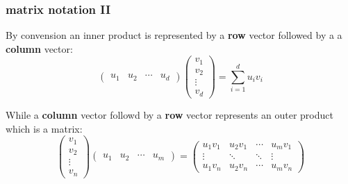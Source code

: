 \documentclass[smaller]{beamer}
\def\darkred{\color{red!70!black}}
\def\vone{{\vskip.1in}}
\begin{document}
\begin{frame}
\frametitle{matrix notation II}

\pause \vone
By convension an {\darkred inner} product is represented by a {\bf row} vector
followed by a a {\bf column} vector:
$$
\begin{pmatrix} u_1 & u_2 &\cdots& u_d \end{pmatrix} \begin{pmatrix} v_1
  \\ v_2 \\ \vdots \\
  v_d \end{pmatrix} = \sum_{i=1}^d u_i v_i
$$

\pause \vone
While a {\bf column} vector followd by a {\bf row} vector represents
an {\darkred outer} product which is a matrix: 
$$ 
\begin{pmatrix} v_1  \\ v_2 \\ \vdots \\  v_n \end{pmatrix} 
\begin{pmatrix} u_1 & u_2 &\cdots& u_m \end{pmatrix}  =
\begin{pmatrix}
u_1 v_1 & u_2 v_1 & \cdots & u_m v_1 \\
\vdots & \ddots & \ddots & \vdots \\
u_1 v_n & u_2 v_n & \cdots & u_m v_n
\end{pmatrix}
$$


\end{frame}
\end{document}
